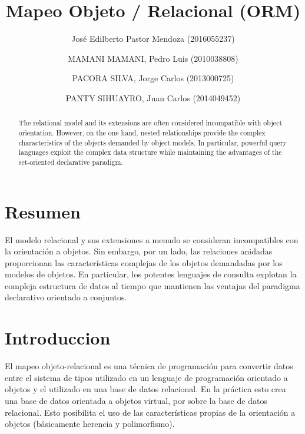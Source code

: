 \documentclass[preprint,12pt]{elsarticle}
\begin{document}
	


	\begin{frontmatter}

		\title{\huge  Mapeo Objeto / Relacional (ORM)}
		
		\author{José Edilberto Pastor Mendoza              (2016055237)}
		\author{MAMANI MAMANI, Pedro Luis              (2010038808)}
		\author{PACORA SILVA, Jorge Carlos                   (2013000725)}
		\author{PANTY SIHUAYRO, Juan Carlos               (2014049452)}
		
		\address{Tacna, Perú}
		
		\begin{abstract}
			


The relational model and its extensions are often considered incompatible with object orientation. However, on the one hand, nested relationships provide the complex characteristics of the objects demanded by object models. In particular, powerful query languages exploit the complex data structure while maintaining the advantages of the set-oriented declarative paradigm.



		\end{abstract}
\end{frontmatter}

	\section{Resumen}
El modelo relacional y sus extensiones a menudo se consideran incompatibles con la orientación a objetos. Sin embargo, por un lado, las relaciones anidadas proporcionan las características complejas de los objetos demandadas por los modelos de objetos. En particular, los potentes lenguajes de consulta explotan la compleja estructura de datos al tiempo que mantienen las ventajas del paradigma declarativo orientado a conjuntos. 


\section{Introduccion}

El mapeo objeto-relacional es una técnica de programación para convertir datos entre el sistema de tipos utilizado en un lenguaje de programación orientado a objetos y el utilizado en una base de datos relacional. En la práctica esto crea una base de datos orientada a objetos virtual, por sobre la base de datos relacional. Esto posibilita el uso de las características propias de la orientación a objetos (básicamente herencia y polimorfismo). 
\end{document}
